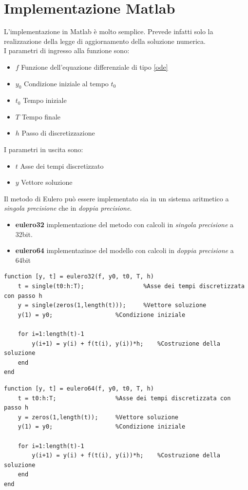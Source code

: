\section{Implementazione Matlab}
L'implementazione in Matlab è molto semplice. Prevede infatti solo la realizzazione della legge di aggiornamento della soluzione numerica.
\\I parametri di ingresso alla funzione sono:
\begin{itemize}
	\item \textbf{$f$} Funzione dell'equazione differenziale di tipo \ref{ode}
	\item \textbf{$y_0$} Condizione iniziale al tempo $t_0$
	\item \textbf{$t_0$} Tempo iniziale
	\item \textbf{$T$} Tempo finale
	\item \textbf{$h$} Passo di discretizzazione
\end{itemize}
I parametri in uscita sono:
\begin{itemize}
	\item \textbf{$t$} Asse dei tempi discretizzato
	\item \textbf{$y$} Vettore soluzione
\end{itemize}
Il metodo di Eulero può essere implementato sia in un sistema aritmetico a \textit{singola precisione} che in \textit{doppia precisione}.
\begin{itemize}
	\item \textbf{eulero32} implementazione del metodo con calcoli in \textit{singola precisione} a 32bit.
	\item \textbf{eulero64} implementazinoe del modello con calcoli in \textit{doppia precisione} a 64bit
\end{itemize}
\begin{verbatim}
function [y, t] = eulero32(f, y0, t0, T, h)
	t = single(t0:h:T);                 %Asse dei tempi discretizzata con passo h
	y = single(zeros(1,length(t)));     %Vettore soluzione
	y(1) = y0;                  %Condizione iniziale
	
	for i=1:length(t)-1
		y(i+1) = y(i) + f(t(i), y(i))*h;    %Costruzione della soluzione
	end
end
\end{verbatim}
\begin{verbatim}
function [y, t] = eulero64(f, y0, t0, T, h)
	t = t0:h:T;                 %Asse dei tempi discretizzata con passo h
	y = zeros(1,length(t));     %Vettore soluzione
	y(1) = y0;                  %Condizione iniziale
	
	for i=1:length(t)-1
		y(i+1) = y(i) + f(t(i), y(i))*h;    %Costruzione della soluzione
	end
end
\end{verbatim}
